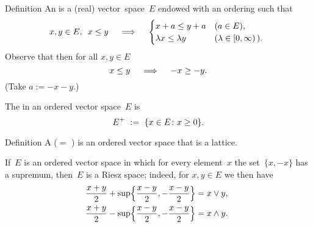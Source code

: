 \documentclass[main.tex]{subfiles}
\begin{document}
\begin{psec}{1.2}{Definition}
An  
is a (real) vector~space~$E$
endowed with an ordering such that
\begin{equation*}
x,y\in E\text{, }\ x\leq y
 \quad \implies \quad
\begin{cases}
x+a \leq y+a  
  & (a\in E)\text{, } \\
\lambda x \leq \lambda y 
  & (\lambda \in [0,\infty)\,)\text{. }
\end{cases}
\end{equation*}
Observe that then for all $x,y\in E$
\begin{equation*}
x\leq y \quad \implies \quad -x \geq -y\text{.}
\end{equation*}
(Take $a:=-x-y$.)

The  in an ordered vector space~$E$ is
\begin{equation*}
E^+\ :=\ \{ x\in E\colon x\geq 0 \} \text{.}
\end{equation*}
\end{psec}
%
%
\begin{psec}{1.3}{Definition}
A  ($=$ )
is an ordered vector space that is a lattice.

If~$E$ is an ordered vector space 
in which for every element~$x$
the set~$\{x,-x\}$ has a supremum,
then~$E$ is a Riesz space;
indeed,
for $x,y\in E$
we then have
\begin{align*}
\frac{x+y}{2} + \sup\Bigl\{ \frac{x-y}{2}, -\frac{x-y}{2} \Bigr\} 
  & = x\vee y\text{,} \\ 
\frac{x+y}{2} - \sup\Bigl\{ \frac{x-y}{2}, -\frac{x-y}{2} \Bigr\}
  & = x\wedge y\text{. }
\end{align*}
\end{psec}
%
%
\end{document}
